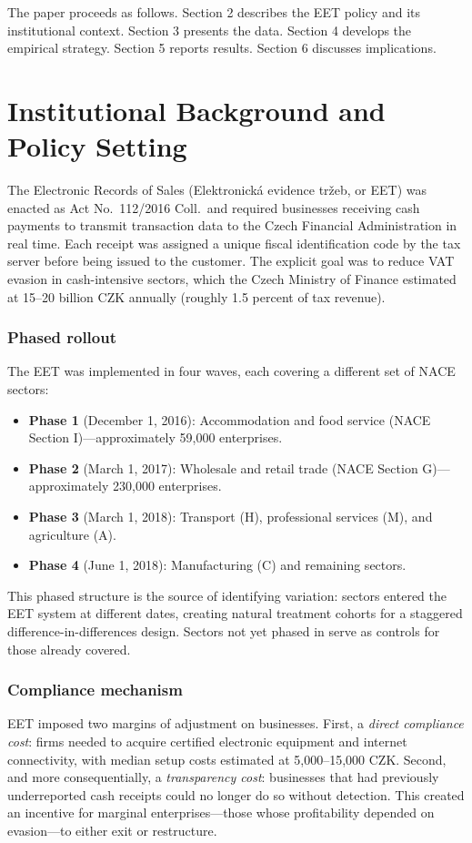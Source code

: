 \documentclass[12pt]{article}
\begin{document}
The paper proceeds as follows. Section 2 describes the EET policy and its institutional context. Section 3 presents the data. Section 4 develops the empirical strategy. Section 5 reports results. Section 6 discusses implications.


\section{Institutional Background and Policy Setting}

The Electronic Records of Sales (Elektronick\'{a} evidence tr\v{z}eb, or EET) was enacted as Act No.\ 112/2016 Coll.\ and required businesses receiving cash payments to transmit transaction data to the Czech Financial Administration in real time. Each receipt was assigned a unique fiscal identification code by the tax server before being issued to the customer. The explicit goal was to reduce VAT evasion in cash-intensive sectors, which the Czech Ministry of Finance estimated at 15--20 billion CZK annually (roughly 1.5 percent of tax revenue).

\subsubsection*{Phased rollout} The EET was implemented in four waves, each covering a different set of NACE sectors:

\begin{itemize}[nosep]
  \item \textbf{Phase 1} (December 1, 2016): Accommodation and food service (NACE Section I)---approximately 59,000 enterprises.
  \item \textbf{Phase 2} (March 1, 2017): Wholesale and retail trade (NACE Section G)---approximately 230,000 enterprises.
  \item \textbf{Phase 3} (March 1, 2018): Transport (H), professional services (M), and agriculture (A).
  \item \textbf{Phase 4} (June 1, 2018): Manufacturing (C) and remaining sectors.
\end{itemize}

This phased structure is the source of identifying variation: sectors entered the EET system at different dates, creating natural treatment cohorts for a staggered difference-in-differences design. Sectors not yet phased in serve as controls for those already covered.

\subsubsection*{Compliance mechanism} EET imposed two margins of adjustment on businesses. First, a \textit{direct compliance cost}: firms needed to acquire certified electronic equipment and internet connectivity, with median setup costs estimated at 5,000--15,000 CZK. Second, and more consequentially, a \textit{transparency cost}: businesses that had previously underreported cash receipts could no longer do so without detection. This created an incentive for marginal enterprises---those whose profitability depended on evasion---to either exit or restructure.
\end{document}
